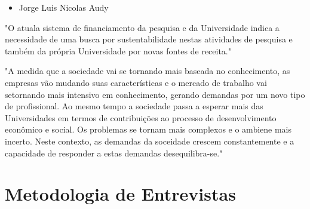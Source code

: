 \begin{itemize}
\item Jorge Luis Nicolas Audy
\end{itemize}

"O atuala sistema de financiamento da pesquisa e da Universidade indica a necessidade de uma busca por sustentabilidade nestas atividades de pesquisa e também da própria Universidade por novas fontes de receita."

"A medida que a sociedade vai se tornando mais baseada no conhecimento, as empresas vão mudando suas características e o mercado de trabalho vai setornando mais intensivo em conhecimento, gerando demandas por um novo tipo de profissional. Ao mesmo tempo a sociedade passa a esperar mais das Universidades em termos de contribuições ao processo de desenvolvimento econômico e social. Os problemas se tornam mais complexos e o ambiene mais incerto. Neste contexto, as demandas da soceidade crescem constantemente e a capacidade de responder a estas demandas desequilibra-se."

\section{Metodologia de Entrevistas}
\label{cha:ensino}
